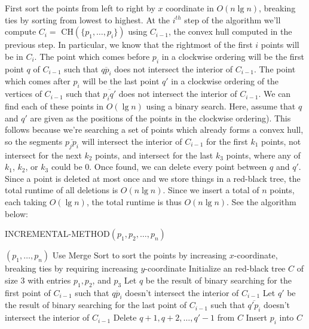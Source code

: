 \documentclass{article}
\begin{document}
First sort the points from left to right by $x$ coordinate in $O(n\lg n)$, breaking ties by sorting from lowest to highest.  At the $i^{th}$ step of the algorithm we'll compute $C_i =$ CH$(\{p_1, \ldots, p_{i}\})$ using $C_{i-1}$, the convex hull computed in the previous step. In particular, we know that the rightmost of the first $i$ points will be in $C_i$.  The point which comes before $p_i$ in a clockwise ordering will be the first point $q$ of $C_{i-1}$ such that $\overline{qp_i}$ does not intersect the interior of $C_{i-1}$.  The point which comes after $p_i$ will be the last point $q'$ in a clockwise ordering of the vertices of $C_{i-1}$ such that $\overline{p_i q'}$ does not intersect the interior of $C_{i-1}$.  We can find each of these points in $O(\lg n)$ using a binary search.  Here, assume that $q$ and $q'$ are given as the positions of the points in the clockwise ordering).  This follows because we're searching a set of points which already forms a convex hull, so the segments $\overline{p_j p_i}$ will intersect the interior of $C_{i-1}$ for the first $k_1$ points, not intersect for the next $k_2$ points, and intersect for the last $k_3$ points, where any of $k_1$, $k_2$, or $k_3$ could be 0. Once found, we can delete every point between $q$ and $q'$.  Since a point is deleted at most once and we store things in a red-black tree, the total runtime of all deletions is $O(n\lg n)$.  Since we insert a total of $n$ points, each taking $O(\lg n)$, the total runtime is thus $O(n\lg n)$.  See the algorithm below:

\begin{algorithm}
\caption{INCREMENTAL-METHOD$(p_1, p_2, \ldots, p_n)$}
\begin{algorithmic}
	\State \Return $(p_1, \ldots, p_n)$
\EndIf
\State Use Merge Sort to sort the points by increasing $x$-coordinate, breaking ties by requiring increasing $y$-coordinate
\State Initialize an red-black tree $C$ of size 3 with entries $p_1, p_2$, and $p_3$
	\State Let $q$ be the result of binary searching for the first point of $C_{i-1}$ such that $\overline{qp_i}$ doesn't intersect the interior of $C_{i-1}$
	\State Let $q'$ be the result of binary searching for the last point of $C_{i-1}$ such that $\overline{q'p_i}$ doesn't intersect the interior of $C_{i-1}$
	\State Delete $q+1, q+2, \ldots, q'-1$ from $C$
	\State Insert $p_i$ into $C$
\EndFor
\end{algorithmic}
\end{algorithm}
\end{document}
